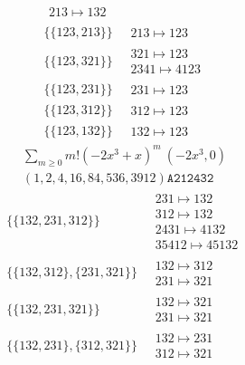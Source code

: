 \begin{scriptsize}
\begin{align}
\begin{matrix}
213 \mapsto 132
\end{matrix}
\\
\{\{123, 213\}\}
\ 
&
\begin{matrix}
213 \mapsto 123
\end{matrix}
\\
\{\{123, 321\}\}
\ 
&
\begin{matrix}
321 \mapsto 123\\2341 \mapsto 4123
\end{matrix}
\\
\{\{123, 231\}\}
\ 
&
\begin{matrix}
231 \mapsto 123
\end{matrix}
\\
\{\{123, 312\}\}
\ 
&
\begin{matrix}
312 \mapsto 123
\end{matrix}
\\
\{\{123, 132\}\}
\ 
&
\begin{matrix}
132 \mapsto 123
\end{matrix}
\end{align}
$$
\begin{matrix}
\sum_{m \geq 0} m! \left(
-2 x^{3} + x
\right)^m
\ 
\left(-2 x^{3}, 0\right)
\\
\left(1, 2, 4, 16, 84, 536, 3912\right)
\texttt{A212432}
\end{matrix}
$$
\begin{align}
\{\{132, 231, 312\}\}
\ 
&
\begin{matrix}
231 \mapsto 132\\312 \mapsto 132\\2431 \mapsto 4132\\35412 \mapsto 45132
\end{matrix}
\\
\{\{132, 312\}, \{231, 321\}\}
\ 
&
\begin{matrix}
132 \mapsto 312\\231 \mapsto 321
\end{matrix}
\\
\{\{132, 231, 321\}\}
\ 
&
\begin{matrix}
132 \mapsto 321\\231 \mapsto 321
\end{matrix}
\\
\{\{132, 231\}, \{312, 321\}\}
\ 
&
\begin{matrix}
132 \mapsto 231\\312 \mapsto 321
\end{matrix}
\\

\end{align}
\end{scriptsize}
